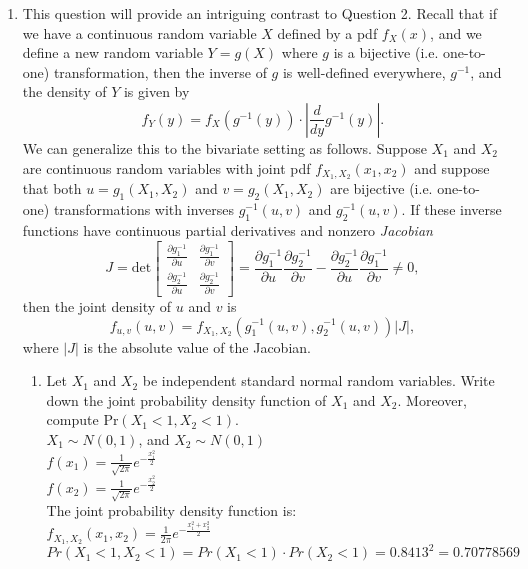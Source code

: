 \documentclass[11pt]{article}
\newcommand{\pr}{\text{Pr}}
\begin{document}
\begin{enumerate}[label=\textbf{Question \arabic*:},start=1]
\item 
This question will provide an intriguing contrast to Question 2. Recall that if we have a continuous random variable $X$ defined by a pdf $f_X(x)$, and we define a new random variable $Y = g(X)$ where $g$ is a bijective (i.e. one-to-one) transformation, then the inverse of $g$ is well-defined everywhere, $g^{-1}$, and the density of $Y$ is given by $$f_Y(y) = f_X(g^{-1}(y))\cdot \left| \frac d{dy} g^{-1}(y)\right|.$$ We can generalize this to the bivariate setting as follows. Suppose $X_1$ and $X_2$ are continuous random variables with joint pdf $f_{X_1,X_2}(x_1,x_2)$ and suppose that both $u = g_1(X_1,X_2)$ and $v = g_2(X_1,X_2)$ are bijective (i.e. one-to-one) transformations with inverses $g_1^{-1}(u,v)$ and $g_2^{-1}(u,v)$. If these inverse functions have continuous partial derivatives and nonzero {\em Jacobian} 
\[
J = \text{det}
\begin{bmatrix}
	\frac {\partial g_1^{-1}}{\partial u}	& \frac {\partial g_1^{-1}}{\partial v} \\
	\frac {\partial g_2^{-1}}{\partial u}	& \frac {\partial g_2^{-1}}{\partial v}
\end{bmatrix}
= \frac {\partial g_1^{-1}}{\partial u} \frac {\partial g_2^{-1}}{\partial v} - \frac {\partial g_2^{-1}}{\partial u} \frac {\partial g_1^{-1}}{\partial v} \neq 0,
\]
then the joint density of $u$ and $v$ is $$f_{u,v}(u,v) = f_{X_1,X_2}\left( g_1^{-1}(u,v), g_2^{-1}(u,v)\right) |J|,$$ where $|J|$ is the absolute value of the Jacobian.

\begin{enumerate}
  \item Let $X_1$ and $X_2$ be independent standard normal random variables. Write down the joint probability density function of $X_1$ and $X_2$. Moreover, compute $\pr(X_1<1,X_2<1)$.\\
  
  $X_1 \sim N(0, 1)$, and $X_2 \sim N(0, 1)$\\
  $f(x_1) = \frac{1}{\sqrt{2 \pi}} e^{-\frac{x_1^2}{2}} $ \\
  $f(x_2) = \frac{1}{\sqrt{2 \pi}} e^{-\frac{x_2^2}{2}}  $ \\
  The joint probability density function is: \\
  $f_{X_1, X_2}(x_1, x_2) = \frac{1}{2 \pi} e^{-\frac{x_1^2 + x_2^2}{2}}$\\
  
  $Pr(X_1 < 1, X_2 < 1) = Pr(X_1 < 1) \cdot Pr(X_2 < 1) = 0.8413^2 = 0.70778569 $\\
  


\end{enumerate}
\end{enumerate}
\end{document}
